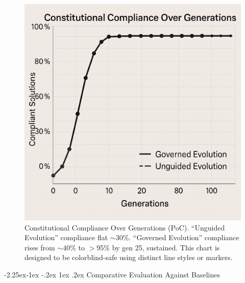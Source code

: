 \documentclass[manuscript,screen,review,anonymous,9pt]{acmart}
\makeatletter
\renewcommand\subsection{\@startsection{subsection}{2}{\z@}%
  {-2.25ex\@plus -1ex \@minus -.2ex}%
  {1ex \@plus .2ex}%
  {\normalfont\large\bfseries}}
\makeatother
\begin{document}
\begin{figure}[htbp]
	\centering
	\includegraphics[width=\linewidth,keepaspectratio]{Figure 4_ Constitutional Compliance Over Generations.png}
	\caption[Constitutional compliance over generations line chart]{Constitutional Compliance Over Generations (PoC). ``Unguided Evolution'' compliance flat $\sim$30\%. ``Governed Evolution'' compliance rises from $\sim$40\% to $>$95\% by gen 25, sustained. This chart is designed to be colorblind-safe using distinct line styles or markers.}
	\label{fig:compliance_over_generations}
\end{figure}

\subsection{Comparative Evaluation Against Baselines}
\label{subsec:comparative_evaluation}
\end{document}
